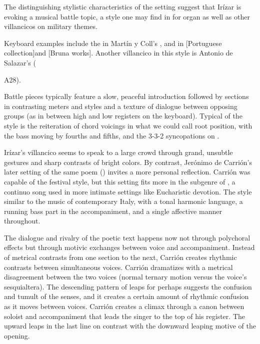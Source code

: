 The distinguishing stylistic characteristics of the setting suggest that Irízar is evoking a musical battle topic, a style one may find in  for organ as well as other villancicos on military themes.%
\begin{Footnote}
  \XXX
  Keyboard examples include the  in Martín y Coll's \XXX, and in [Portuguese collection]\XXX and [Bruna works]\XXX.
  Another villancico in this style is Antonio de Salazar's  (\signature{MEX-Mc}{A28}).
\end{Footnote}
Battle pieces typically feature a slow, peaceful introduction followed by sections in contrasting meters and styles and a texture of dialogue between opposing groups (as in between high and low registers on the keyboard). 
Typical of the style is the reiteration of chord voicings in what we could call root position, with the bass moving by fourths and fifths, and the 3-3-2 syncopations on .

Irízar's villancico seems to speak to a large crowd through grand, unsubtle gestures and sharp contrasts of bright colors.
By contrast, Jerónimo de Carrión's later setting of the same poem () invites a more personal reflection.
Carrión was capable of the festival style, but this setting fits more in the subgenre of , a continuo song used in more intimate settings like Eucharistic devotion.
The style similar to the  music of contemporary Italy, with a tonal harmonic language, a running bass part in the accompaniment, and a single affective manner throughout.


The dialogue and rivalry of the poetic text happens now not through polychoral effects but through motivic exchanges between voice and accompaniment.
Instead of metrical contrasts from one section to the next, Carrión creates rhythmic contrasts between simultaneous voices.
Carrión dramatizes  with a metrical disagreement between the two voices (normal ternary motion versus the voice's sesquialtera).
The descending pattern of leaps for  perhaps suggests the confusion and tumult of the senses, and it creates a certain amount of rhythmic confusion as it moves between voices.
Carrión creates a climax through a canon between soloist and accompaniment that leads the singer to the top of his register.
The upward leaps in the last line on  contrast with the downward leaping motive of the opening.

